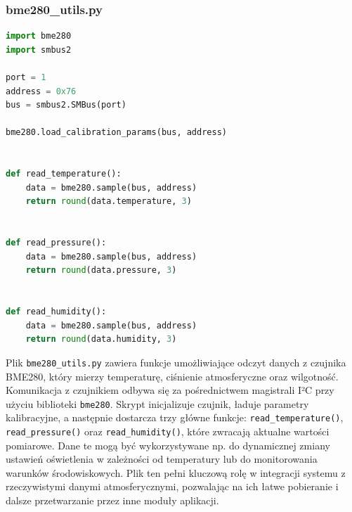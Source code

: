 \documentclass[12pt]{article}
\begin{document}
\subsubsection{bme280\_utils.py}
\begin{lstlisting}[language=Python]
import bme280
import smbus2

port = 1
address = 0x76
bus = smbus2.SMBus(port)

bme280.load_calibration_params(bus, address)


def read_temperature():
    data = bme280.sample(bus, address)
    return round(data.temperature, 3)


def read_pressure():
    data = bme280.sample(bus, address)
    return round(data.pressure, 3)


def read_humidity():
    data = bme280.sample(bus, address)
    return round(data.humidity, 3)

\end{lstlisting}
Plik \texttt{bme280\_utils.py} zawiera funkcje umożliwiające odczyt danych z czujnika BME280, który mierzy temperaturę, ciśnienie atmosferyczne oraz wilgotność. Komunikacja z czujnikiem odbywa
się za pośrednictwem magistrali I²C przy użyciu biblioteki \texttt{bme280}. Skrypt inicjalizuje czujnik, ładuje parametry kalibracyjne, a następnie dostarcza trzy główne funkcje:
\texttt{read\_temperature()}, \texttt{read\_pressure()} oraz \texttt{read\_humidity()}, które zwracają aktualne wartości pomiarowe. Dane te mogą być wykorzystywane np. do dynamicznej zmiany
ustawień oświetlenia w zależności od temperatury lub do monitorowania warunków środowiskowych. Plik ten pełni kluczową rolę w integracji systemu z rzeczywistymi danymi atmosferycznymi,
pozwalając na ich łatwe pobieranie i dalsze przetwarzanie przez inne moduły aplikacji.
\end{document}
